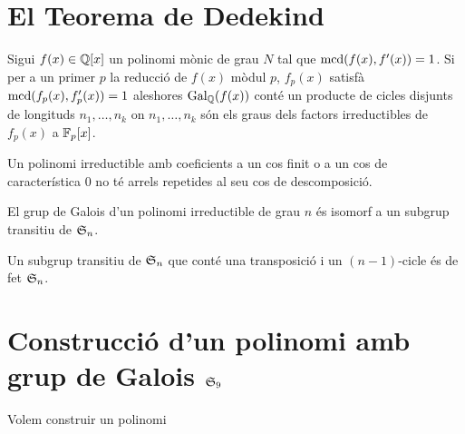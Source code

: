 \documentclass[12pt]{article}
\title{\sffamily {\bfseries Seminari 1}}
\author{\sffamily Arnau Mas, Jaime Pedregal, Sergio Serrano de Haro}
\date{\sffamily 25 de Novembre de 2019}
\begin{document}
\maketitle

\section{El Teorema de Dedekind}
\begin{teorema}[Dedekind]
	Sigui \( f(x) \in \Q[x] \) un polinomi mònic de grau \( N \) tal que \( \mcd(f(x),
	f'(x)) = 1 \). Si per a un primer \( p \) la reducció de \( f(x) \) mòdul \( p \), \(
	f_p(x) \) satisfà \( \mcd(f_p(x), f_p'(x)) = 1 \) aleshores \( \GalQ(f(x)) \) conté un
	producte de cicles disjunts de longituds \( n_1, \dots, n_k \) on \( n_1, \dots, n_k \) són
	els graus dels factors irreductibles de \( f_p(x) \) a \( \F_p[x] \).
\end{teorema}

\begin{lema}
	Un polinomi irreductible amb coeficients a un cos finit o a un cos de característica 0
	no té arrels repetides al seu cos de descomposició.
\end{lema}

\begin{lema}
	El grup de Galois d'un polinomi irreductible de grau \( n \) és isomorf a un subgrup
	transitiu de \( \S_n \).
\end{lema}

\begin{lema}
	Un subgrup transitiu de \( \S_n \) que conté una transposició i un \( (n-1) \)-cicle és
	de fet \( \S_n \).
\end{lema}

\section{Construcció d'un polinomi amb grup de Galois \( \S_9 \)}
Volem construir un polinomi 
\end{document}
